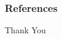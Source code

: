 \documentclass{beamer}
\begin{document}
%
%

\begin{frame}
\frametitle{References}


\end{frame}





\begin{frame}
\Huge{\centerline{Thank You}}
\end{frame}

\end{document}
